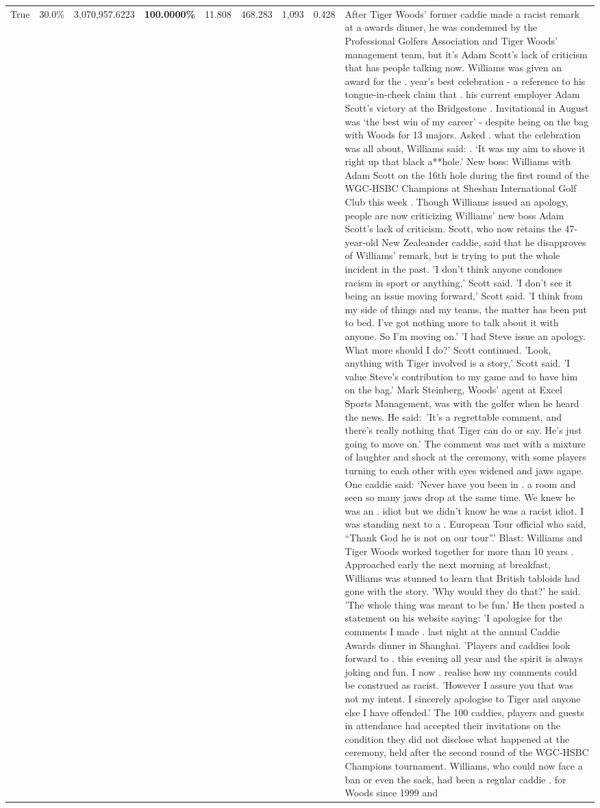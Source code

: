 \begin{table}[H]
\begin{tabular}{lllrlllll}
True & 30.0\% & 3,070,957.6223 & \bfseries \color{red} 100.0000\% & 11.808 & 468.283 & 1,093 & 0.428 & After Tiger Woods' former caddie made a racist remark at a awards dinner, he was condemned by the Professional Golfers Association and Tiger Woods' management team, but it's Adam Scott's lack of criticism that has people talking now. Williams was given an award for the . year’s best celebration - a reference to his tongue-in-cheek claim that . his current employer Adam Scott’s victory at the Bridgestone . Invitational in August was ‘the best win of my career’ - despite being on the bag with Woods for 13 majors. Asked . what the celebration was all about, Williams said: . ‘It was my aim to shove it right up that black a**hole.’ New boss: Williams with Adam Scott  on the 16th hole during the first round of the WGC-HSBC Champions at Sheshan International Golf Club this week . Though Williams issued an apology, people are now criticizing Williams' new boss Adam Scott's lack of criticism. Scott, who now retains the 47-year-old New Zealeander caddie, said that he disapproves of Williams' remark, but is trying to put the whole incident in the past. 'I don't think anyone condones racism in sport or anything,' Scott said. 'I don't see it being an issue moving forward,' Scott said. 'I think from my side of things and my teams, the matter has been put to bed. I've got nothing more to talk about it with anyone. So I'm moving on.' 'I had Steve issue an apology. What more should I do?' Scott continued. 'Look, anything with Tiger involved is a story,' Scott said. 'I value Steve's contribution to my game and to have him on the bag.' Mark Steinberg, Woods' agent at Excel Sports Management, was with the golfer when he heard the news. He said: 'It's a regrettable comment, and there's really nothing that Tiger can do or say. He's just going to move on.' The comment was met with a mixture of laughter and shock at the ceremony, with some players turning to each other with eyes widened and jaws agape. One caddie said: ‘Never have you been in . a room and seen so many jaws drop at the same time. We knew he was an . idiot but we didn’t know he was a racist idiot. I was standing next to a . European Tour official who said, “Thank God he is not on our tour”.’ Blast: Williams and Tiger Woods worked together for more than 10 years . Approached early the next morning at breakfast, Williams was stunned to learn that British tabloids had gone with the story. 'Why would they do that?' he said. 'The whole thing was meant to be fun.' He then posted a statement on his website saying: 'I apologise for the comments I made . last night at the annual Caddie Awards dinner in Shanghai. 'Players and caddies look forward to . this evening all year and the spirit is always joking and fun. I now . realise how my comments could be construed as racist. 'However I assure you that was not my intent. I sincerely apologise to Tiger and anyone else I have offended.' The 100 caddies, players and guests in attendance had accepted their invitations on the condition they did not disclose what happened at the ceremony, held after the second round of the WGC-HSBC Champions tournament. Williams, who could now face a ban or even the sack, had been a regular caddie . for Woods since 1999 and 
\end{tabular}
\end{table}
